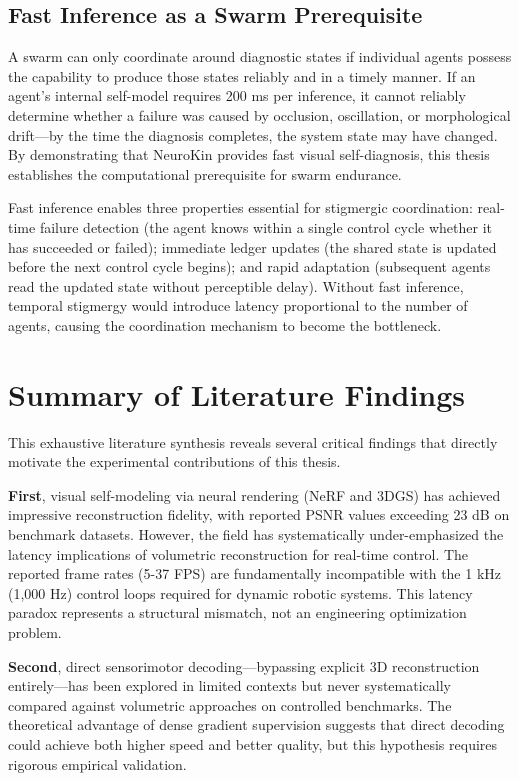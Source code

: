 \documentclass[12pt,a4paper,oneside]{report}
\begin{document}
\subsection{Fast Inference as a Swarm Prerequisite}

A swarm can only coordinate around diagnostic states if individual agents possess the capability to produce those states reliably and in a timely manner. If an agent's internal self-model requires 200 ms per inference, it cannot reliably determine whether a failure was caused by occlusion, oscillation, or morphological drift---by the time the diagnosis completes, the system state may have changed. By demonstrating that NeuroKin provides fast visual self-diagnosis, this thesis establishes the computational prerequisite for swarm endurance.

Fast inference enables three properties essential for stigmergic coordination: real-time failure detection (the agent knows within a single control cycle whether it has succeeded or failed); immediate ledger updates (the shared state is updated before the next control cycle begins); and rapid adaptation (subsequent agents read the updated state without perceptible delay). Without fast inference, temporal stigmergy would introduce latency proportional to the number of agents, causing the coordination mechanism to become the bottleneck.

\section{Summary of Literature Findings}

This exhaustive literature synthesis reveals several critical findings that directly motivate the experimental contributions of this thesis.

\textbf{First}, visual self-modeling via neural rendering (NeRF and 3DGS) has achieved impressive reconstruction fidelity, with reported PSNR values exceeding 23 dB on benchmark datasets. However, the field has systematically under-emphasized the latency implications of volumetric reconstruction for real-time control. The reported frame rates (5-37 FPS) are fundamentally incompatible with the 1 kHz (1,000 Hz) control loops required for dynamic robotic systems. This latency paradox represents a structural mismatch, not an engineering optimization problem.

\textbf{Second}, direct sensorimotor decoding---bypassing explicit 3D reconstruction entirely---has been explored in limited contexts but never systematically compared against volumetric approaches on controlled benchmarks. The theoretical advantage of dense gradient supervision suggests that direct decoding could achieve both higher speed and better quality, but this hypothesis requires rigorous empirical validation.
\end{document}
